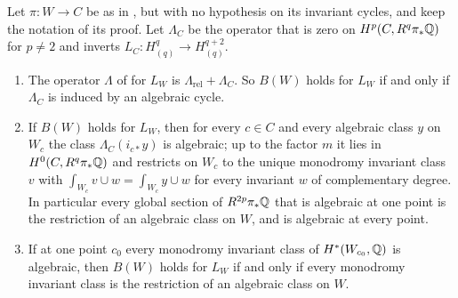 \begin{theorem}\label{thm:lefschetzpropagation}
Let $\pi\colon W\to C$ be as in , but with no
hypothesis on its invariant cycles, and keep the notation of its proof. Let
$\Lambda_{C}$ be the operator that is zero on $H^{p}(C,R^{q}\pi_{*}\mathbb{Q})$ for
$p\ne2$ and inverts $L_{C}\colon H^{q}_{(q)}\to H^{q+2}_{(q)}$.
\begin{enumerate}[label=\textup{(\roman*)},leftmargin=2.6em,itemsep=2pt]
\item The operator $\Lambda$ of  for $L_{W}$ is
  $\Lambda_{\mathrm{rel}}+\Lambda_{C}$. So $B(W)$ holds for $L_{W}$ if and
  only if $\Lambda_{C}$ is induced by an algebraic cycle.
\item If $B(W)$ holds for $L_{W}$, then for every $c\in C$ and every algebraic
  class $y$ on $W_{c}$ the class $\Lambda_{C}(i_{c*}y)$ is algebraic; up to
  the factor $m$ it lies in $H^{0}(C,R^{q}\pi_{*}\mathbb{Q})$ and restricts on
  $W_{c}$ to the unique monodromy invariant class $v$ with
  $\int_{W_{c}}v\cup w=\int_{W_{c}}y\cup w$ for every invariant $w$ of
  complementary degree. In particular every global section of
  $R^{2p}\pi_{*}\mathbb{Q}$ that is algebraic at one point is the restriction of an
  algebraic class on $W$, and is algebraic at every point.
\item If at one point $c_{0}$ every monodromy invariant class of
  $H^{*}(W_{c_{0}},\mathbb{Q})$ is algebraic, then $B(W)$ holds for $L_{W}$ if and
  only if every monodromy invariant class is the restriction of an algebraic
  class on $W$.
\end{enumerate}
\end{theorem}

